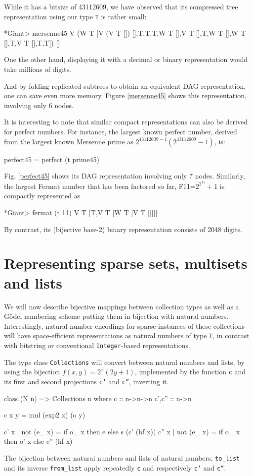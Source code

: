 \documentclass{TOOLS/llncs}
\begin{document}
While it has a bitsize of 43112609, we have observed that its 
compressed tree representation using our type {\tt T} is rather small:
\begin{codex}
*Giant> mersenne45
V (W T [V (V T []) [],T,T,T,W T [],V T [],T,W T [],W T [],T,V T [],T,T]) []
\end{codex}
One the other hand, displaying it with a decimal or binary representation
would take millions of digits.

And by folding replicated subtrees to obtain an equivalent DAG representation,
one can save even more memory. Figure \ref{mersenne45} shows this representation,
involving only 6 nodes.


It is interesting to note that similar compact representations can also
be derived for perfect numbers. For instance, the largest known perfect number, derived
from the largest known Mersenne prime as $2^{43112609-1}(2^{43112609}-1)$,
is:
\begin{code}
perfect45 = perfect (t prime45)
\end{code}
Fig. \ref{perfect45} shows its DAG representation involving only 7 nodes.
Similarly, the largest Fermat number that has been factored so far, F11=$2^{2^{11}}+1$ is compactly represented as 
\begin{codex}
*Giant> fermat (t 11)
V T [T,V T [W T [V T []]]]
\end{codex}
By contrast, its (bijective base-2) binary representation consists of 2048 digits.


\section{Representing sparse sets, multisets and lists} \label{sparse}

We will now describe bijective mappings between collection types as
well as a G\"odel numbering scheme putting them in bijection with
natural numbers. Interestingly, natural number encodings for
sparse instances of these collections will have space-efficient
representations as natural numbers of type {\tt T}, in contrast
with bitstring or conventional {\tt Integer}-based representations.

The type class {\tt Collections} will convert between natural numbers and lists,
by using the bijection $f(x,y)=2^{x}(2y+1)$, implemented by the function {\tt c}
and its first and second projections
{\tt c'} and {\tt c''}, inverting it.
\begin{code}
class (N n) => Collections n where
  c :: n->n->n
  c',c'' :: n->n
 
  c x y = mul (exp2 x) (o y)
  
  c' x | not (e_ x) = if o_ x then e else s (c'  (hf x))
  c'' x | not (e_ x) = if o_ x then o' x else c'' (hf x)
\end{code}
The bijection between natural numbers and lists of natural numbers, {\tt to\_list}
and its inverse {\tt from\_list} apply repeatedly {\tt c}
and respectively {\tt c'} and {\tt c''}.
\end{document}
